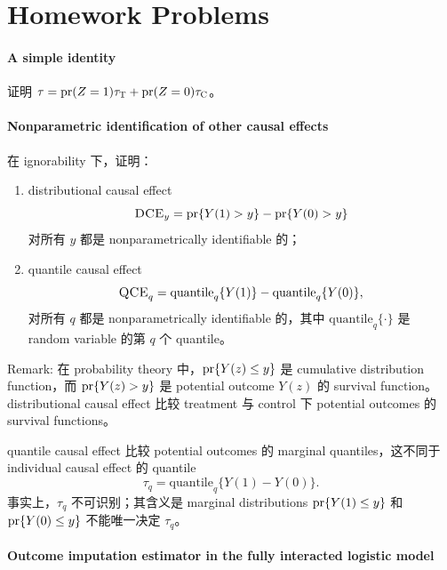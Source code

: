  


\section{Homework Problems}


\paragraph{A simple identity}\label{hw::simple-identity-taus}

证明 $\tau = \textup{pr}(Z=1) \tau_\textsc{T} + \textup{pr}(Z=0)\tau_\textsc{C}$。 


\paragraph{Nonparametric identification of other causal effects}\label{hw::nonparametric-identification-dce-qce}

在 ignorability 下，证明：
\begin{enumerate}
\item
 distributional causal effect
 $$
\textsc{DCE}_y = \textup{pr}\{  Y(1) > y  \} - \textup{pr}\{ Y(0) > y \} 
$$
对所有 $y$ 都是 nonparametrically identifiable 的；
\item
quantile causal effect 
$$
\textsc{QCE}_q = \text{quantile}_q\{ Y(1) \} - \text{quantile}_q\{ Y(0) \},
$$
对所有 $q$ 都是 nonparametrically identifiable 的，其中 $\text{quantile}_q\{ \cdot \} $ 是 random variable 的第 $q$ 个 quantile。 
\end{enumerate}



Remark:
在 probability theory 中，$\textup{pr}\{  Y(z) \leq y \}$ 是 cumulative distribution function，而 $\textup{pr}\{  Y(z) > y \}$ 是 potential outcome $Y(z)$ 的 survival function。
distributional causal effect 比较 treatment 与 control 下 potential outcomes 的 survival functions。 
 
quantile causal effect 比较 potential outcomes 的 marginal quantiles，这不同于 individual causal effect 的 quantile
$$
\tau_q =  \text{quantile}_q\{ Y(1)  - Y(0)\} .
$$
事实上，$\tau_q$ 不可识别；其含义是 marginal distributions $\textup{pr}\{  Y(1) \leq  y  \} $ 和 $ \textup{pr}\{ Y(0) \leq  y \} $ 不能唯一决定 $\tau_q$。 


\paragraph{Outcome imputation estimator in the fully interacted logistic model}\label{hw::outcome-two-logit}

